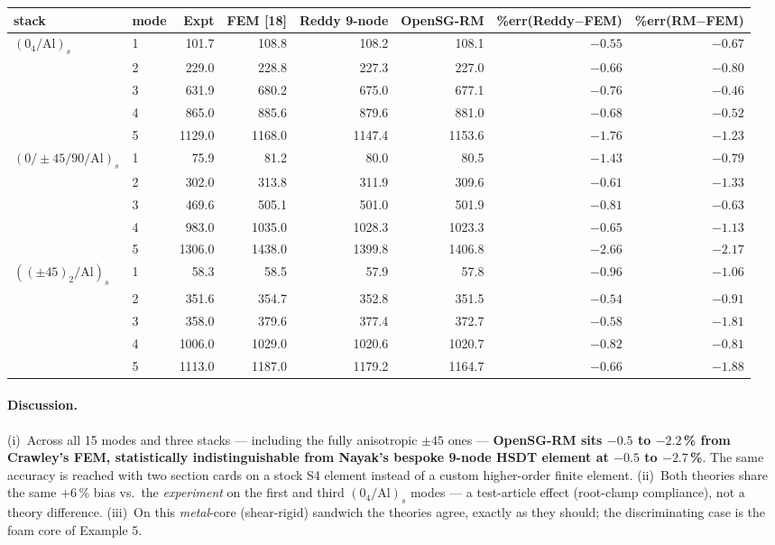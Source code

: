 \documentclass[11pt]{article}
\begin{document}
\begin{center}\footnotesize
\begin{tabular}{llrrrrrr}\toprule
stack & mode & Expt & FEM [18] & Reddy 9-node & OpenSG-RM &
\%err(Reddy$-$FEM) & \%err(RM$-$FEM)\\
\midrule
$(0_4/\mathrm{Al})_s$
 & 1 & 101.7 & 108.8 & 108.2 & 108.1 & $-0.55$ & $-0.67$\\
 & 2 & 229.0 & 228.8 & 227.3 & 227.0 & $-0.66$ & $-0.80$\\
 & 3 & 631.9 & 680.2 & 675.0 & 677.1 & $-0.76$ & $-0.46$\\
 & 4 & 865.0 & 885.6 & 879.6 & 881.0 & $-0.68$ & $-0.52$\\
 & 5 & 1129.0 & 1168.0 & 1147.4 & 1153.6 & $-1.76$ & $-1.23$\\
\midrule
$(0/{\pm}45/90/\mathrm{Al})_s$
 & 1 & 75.9 & 81.2 & 80.0 & 80.5 & $-1.43$ & $-0.79$\\
 & 2 & 302.0 & 313.8 & 311.9 & 309.6 & $-0.61$ & $-1.33$\\
 & 3 & 469.6 & 505.1 & 501.0 & 501.9 & $-0.81$ & $-0.63$\\
 & 4 & 983.0 & 1035.0 & 1028.3 & 1023.3 & $-0.65$ & $-1.13$\\
 & 5 & 1306.0 & 1438.0 & 1399.8 & 1406.8 & $-2.66$ & $-2.17$\\
\midrule
$((\pm45)_2/\mathrm{Al})_s$
 & 1 & 58.3 & 58.5 & 57.9 & 57.8 & $-0.96$ & $-1.06$\\
 & 2 & 351.6 & 354.7 & 352.8 & 351.5 & $-0.54$ & $-0.91$\\
 & 3 & 358.0 & 379.6 & 377.4 & 372.7 & $-0.58$ & $-1.81$\\
 & 4 & 1006.0 & 1029.0 & 1020.6 & 1020.7 & $-0.82$ & $-0.81$\\
 & 5 & 1113.0 & 1187.0 & 1179.2 & 1164.7 & $-0.66$ & $-1.88$\\
\bottomrule\end{tabular}\end{center}

\paragraph{Discussion.}
(i)~Across all 15 modes and three stacks --- including the fully
anisotropic $\pm45$ ones --- \textbf{OpenSG-RM sits $-0.5$ to $-2.2$\,\% from
Crawley's FEM, statistically indistinguishable from Nayak's bespoke
9-node HSDT element at $-0.5$ to $-2.7$\,\%}.  The same accuracy is
reached with two section cards on a stock S4 element instead of a custom
higher-order finite element.
(ii)~Both theories share the same $+6$\,\% bias vs.\ the \emph{experiment}
on the first and third $(0_4/\mathrm{Al})_s$ modes --- a test-article
effect (root-clamp compliance), not a theory difference.
(iii)~On this \emph{metal}-core (shear-rigid) sandwich the theories agree,
exactly as they should; the discriminating case is the foam core of
Example 5.
\end{document}
